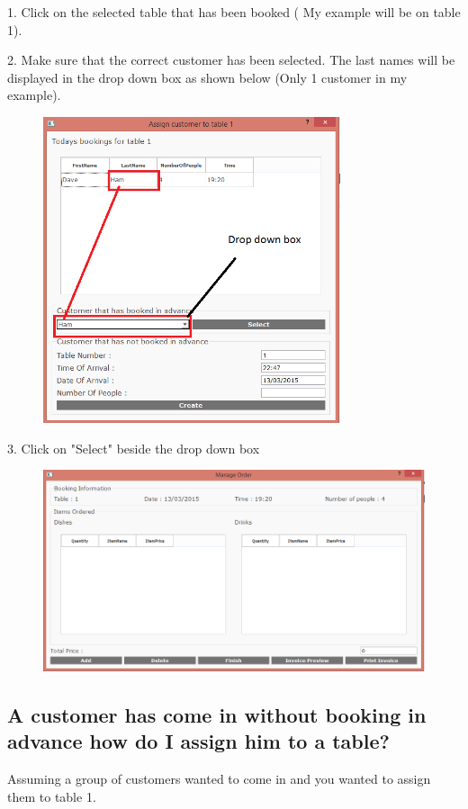 1. Click on the selected table that has been booked ( My example will be on table 1).

2. Make sure that the correct customer has been selected. The last names will be displayed in the drop down box as shown below (Only 1 customer in my example).
\begin{figure}[H]
    \includegraphics[height = 9cm]{./Manual/images/assignExample1} 
    \caption{} \label{fig:assignex1}
\end{figure}

3. Click on "Select" beside the drop down box

\begin{figure}[H]
    \includegraphics[width = 12cm]{./Manual/images/base/assignExample2} 
    \caption{} \label{fig:assignex2}
\end{figure}

\newpage
\subsection{A customer has come in without booking in advance how do I assign him to a table?}
Assuming a group of customers wanted to come in and you wanted to assign them to table 1.

